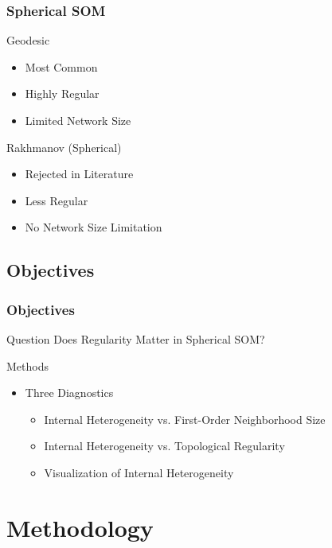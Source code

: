 \documentclass[nototal,handout]{beamer}
\begin{document}
\begin{frame}
	\frametitle{Spherical SOM}
 
\begin{block}{Geodesic}
 \begin{itemize}
 \item  Most Common
 \item  Highly Regular
 \item  Limited Network Size
 \end{itemize}
 \end{block} 
\begin{block}{Rakhmanov (Spherical)}
 \begin{itemize}
 \item  Rejected in Literature
 \item  Less Regular
 \item  No Network Size Limitation
 \end{itemize}
 \end{block} \end{frame} 

\subsection{Objectives} 

\begin{frame}
	\frametitle{Objectives}
 
\begin{block}{Question}
  Does Regularity Matter in Spherical SOM?
 \end{block} 
\begin{block}{Methods}
 \begin{itemize}
 \item  Three Diagnostics
 \begin{itemize}
 \item  Internal Heterogeneity vs. First-Order Neighborhood Size
 \item  Internal Heterogeneity vs. Topological Regularity
 \item  Visualization of Internal Heterogeneity
 \end{itemize}
 \end{itemize}
 \end{block} \end{frame} 


\section{Methodology} 
\end{document}
